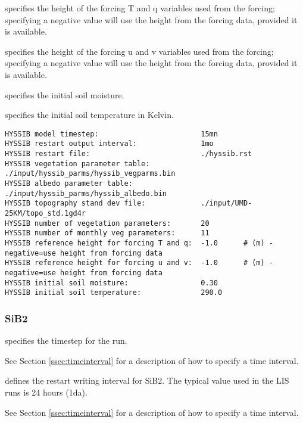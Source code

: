   specifies the
 height of the forcing T and q variables used from the forcing;
 specifying a negative value will use the height from the forcing
 data, provided it is available.

  specifies the
 height of the forcing u and v variables used from the forcing;
 specifying a negative value will use the height from the forcing
 data, provided it is available.

  specifies the
 initial soil moisture.

  specifies the
 initial soil temperature in Kelvin.
 

 \begin{Verbatim}[frame=single]
HYSSIB model timestep:                        15mn
HYSSIB restart output interval:               1mo
HYSSIB restart file:                          ./hyssib.rst
HYSSIB vegetation parameter table:            ./input/hyssib_parms/hyssib_vegparms.bin
HYSSIB albedo parameter table:                ./input/hyssib_parms/hyssib_albedo.bin
HYSSIB topography stand dev file:             ./input/UMD-25KM/topo_std.1gd4r
HYSSIB number of vegetation parameters:       20
HYSSIB number of monthly veg parameters:      11
HYSSIB reference height for forcing T and q:  -1.0      # (m) - negative=use height from forcing data
HYSSIB reference height for forcing u and v:  -1.0      # (m) - negative=use height from forcing data
HYSSIB initial soil moisture:                 0.30
HYSSIB initial soil temperature:              290.0
 \end{Verbatim}

 
 
 \subsubsection{SiB2} \label{sssec:lsm_sib2}
 

 
  specifies the timestep for the run.

 See Section \ref{ssec:timeinterval} for a description
 of how to specify a time interval.

  defines the restart
 writing interval for SiB2.  The typical value used in the
 LIS runs is 24 hours (1da).

 See Section \ref{ssec:timeinterval} for a description
 of how to specify a time interval.

